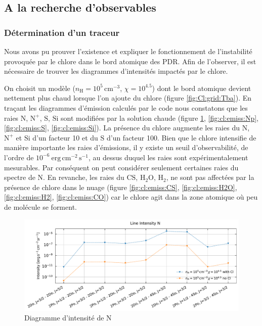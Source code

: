 
\subsection{A la recherche d'observables}
\subsubsection{Détermination d'un traceur}

Nous avons pu prouver l'existence et expliquer le fonctionnement de l'instabilité provoquée par le chlore dans le bord atomique des PDR. Afin de l'observer, il est nécessaire de trouver les diagrammes d'intensités impactés par le chlore. \newline 

On choisit un modèle ($n_\mathrm{H}=10^5 \, \mathrm{cm}^{-3}$, $\chi=10^{4.5}$) dont le bord atomique devient nettement plus chaud lorsque l'on ajoute du chlore (figure \ref{fig:Cl:grid:Tba}). En traçant les diagrammes d'émission calculés par le code nous constatons que les raies $\mathrm{N}$, $\mathrm{N}^+$, $\mathrm{S}$, $\mathrm{Si}$ sont modifiées par la solution chaude (figure \ref{fig:cl:emiss:N}, \ref{fig:cl:emiss:Np}, \ref{fig:cl:emiss:S}, \ref{fig:cl:emiss:Si}). La présence du chlore augmente les raies du $\mathrm{N}$, $\mathrm{N}^+$ et $\mathrm{Si}$ d'un facteur 10 et du $\mathrm{S}$ d'un facteur 100. Bien que le chlore intensifie de manière importante les raies d'émissions, il y existe un seuil d'observabilité, de l'ordre de $10^{-6} \ \mathrm{erg}\,\mathrm{cm}^{-2}\,\mathrm{s}^{-1}$, au dessus duquel les raies sont expérimentalement mesurables. Par conséquent on peut considérer seulement certaines raies du spectre de $\mathrm{N}$. En revanche, les raies du $\mathrm{CS}$, $\mathrm{H}_2\mathrm{O}$, $\mathrm{H}_2$, ne sont pas affectées par la présence de chlore dans le nuage (figure \ref{fig:cl:emiss:CS}, \ref{fig:cl:emiss:H2O}, \ref{fig:cl:emiss:H2}, \ref{fig:cl:emiss:CO}) car le chlore agit dans la zone atomique où peu de molécule se forment. \newline

\begin{figure}[!h]
    \centering
    \centering \includegraphics[trim = {0 0 0 1cm},clip,width=1\textwidth]{figure/Cl/gridModelEmiss/I_comp_N.pdf}
        \caption{Diagramme d'intensité de $\mathrm{N}$}
        \label{fig:cl:emiss:N}
\end{figure}

